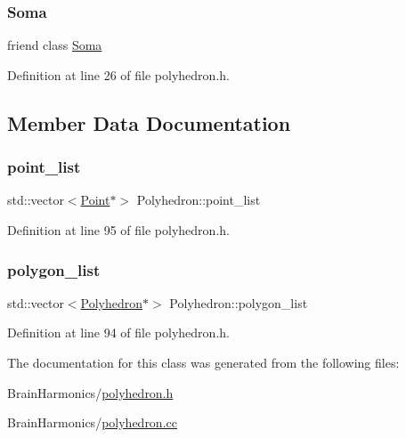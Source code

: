 \subsubsection{\texorpdfstring{Soma}{Soma}}
{\footnotesize\ttfamily friend class \mbox{\hyperlink{class_soma}{Soma}}\hspace{0.3cm}{\ttfamily [friend]}}



Definition at line 26 of file polyhedron.\+h.



\subsection{Member Data Documentation}
\mbox{\label{class_polyhedron_a4a39c8beb34831634b871dbc301502a6}} 
\subsubsection{\texorpdfstring{point\+\_\+list}{point\_list}}
{\footnotesize\ttfamily std\+::vector$<$\mbox{\hyperlink{class_point}{Point}}$\ast$$>$ Polyhedron\+::point\+\_\+list\hspace{0.3cm}{\ttfamily [protected]}}



Definition at line 95 of file polyhedron.\+h.

\mbox{\label{class_polyhedron_afd0cf6dddfbdc36266a73edca0c2c219}} 
\subsubsection{\texorpdfstring{polygon\+\_\+list}{polygon\_list}}
{\footnotesize\ttfamily std\+::vector$<$\mbox{\hyperlink{class_polyhedron}{Polyhedron}}$\ast$$>$ Polyhedron\+::polygon\+\_\+list\hspace{0.3cm}{\ttfamily [protected]}}



Definition at line 94 of file polyhedron.\+h.



The documentation for this class was generated from the following files\+:\begin{DoxyCompactItemize}
\item 
Brain\+Harmonics/\mbox{\hyperlink{polyhedron_8h}{polyhedron.\+h}}\item 
Brain\+Harmonics/\mbox{\hyperlink{polyhedron_8cc}{polyhedron.\+cc}}\end{DoxyCompactItemize}
